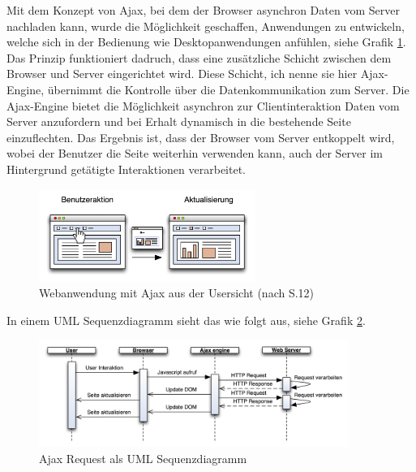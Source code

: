   
  Mit dem Konzept von \ac{Ajax}, bei dem der Browser asynchron Daten vom Server
  nachladen kann, wurde die Möglichkeit geschaffen, Anwendungen zu entwickeln,
  welche sich in der Bedienung wie Desktopanwendungen anfühlen, siehe Grafik
  \ref{img:ajaxPageReload}. Das Prinzip funktioniert dadruch, dass eine
  zusätzliche Schicht zwischen dem Browser und Server eingerichtet wird. Diese
  Schicht, ich nenne sie hier Ajax-Engine, übernimmt die Kontrolle über die
  Datenkommunikation zum Server. Die Ajax-Engine bietet die Möglichkeit
  asynchron zur Clientinteraktion Daten vom Server anzufordern und bei Erhalt
  dynamisch in die bestehende Seite einzuflechten. Das Ergebnis ist, dass der
  Browser vom Server entkoppelt wird, wobei der Benutzer die Seite weiterhin
  verwenden kann, auch der Server im Hintergrund getätigte Interaktionen
  verarbeitet.
  
  \begin{figure}[hbt]
    \begin{center}
      \includegraphics[width=0.63\textwidth]{./image/ajaxPageReload.png}
      \caption{Webanwendung mit Ajax aus der Usersicht (nach
      \cite{DiplomarbeitStephanSchuster} S.12)}
      \label{img:ajaxPageReload}
    \end{center}
  \end{figure}
  
  In einem \ac{UML} Sequenzdiagramm sieht das wie folgt aus, siehe Grafik
  \ref{img:sequenzdiagrammAjaxPageReload}.
  
  \begin{figure}[hbt]
    \begin{center}
      \includegraphics[width=0.9\textwidth]{./image/sequenzdiagrammAjaxPageReload.png}
      \caption{Ajax Request als \ac{UML} Sequenzdiagramm}
      \label{img:sequenzdiagrammAjaxPageReload}
    \end{center}
  \end{figure}
  
